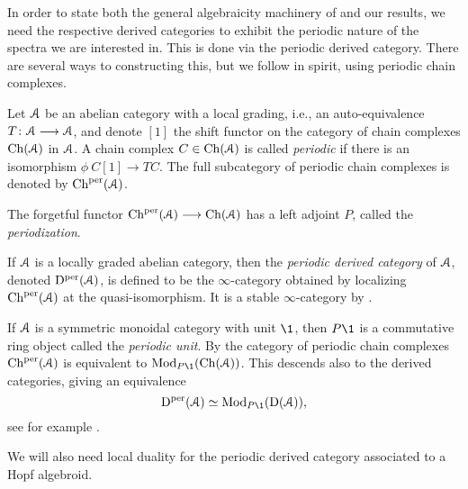 In order to state both the general algebraicity machinery of \cite{patchkoria-pstragowski_2021} and our results, we need the respective derived categories to exhibit the periodic nature of the spectra we are interested in. This is done via the periodic derived category. There are several ways to constructing this, but we follow \cite{franke_96} in spirit, using periodic chain complexes. 

\begin{definition}
    \label{ch1:def:periodic-chain-complex}
    Let $\EuScript{A}$ be an abelian category with a local grading, i.e., an auto-equivalence $T\colon \EuScript{A}\longrightarrow\EuScript{A}$, and denote $[1]$ the shift functor on the category of chain complexes $\mathrm{Ch}(\EuScript{A})$ in $\EuScript{A}$. A chain complex $C\in \mathrm{Ch}(\EuScript{A})$ is called \emph{periodic} if there is an isomorphism $\phi\: C[1]\longrightarrow TC$. The full subcategory of periodic chain complexes is denoted by $\mathrm{Ch}^{\mathrm{per}}(\EuScript{A})$. 
\end{definition}

\begin{definition}
    The forgetful functor $\mathrm{Ch}^{\mathrm{per}}(\EuScript{A})\longrightarrow \mathrm{Ch}(\EuScript{A})$ has a left adjoint $P$, called the \emph{periodization}. 
\end{definition}

\begin{definition}
    \label{ch1:def:periodic-derived-category}
    If $\EuScript{A}$ is a locally graded abelian category, then the \emph{periodic derived category} of $\EuScript{A}$, denoted $\mathrm{D}^{\mathrm{per}}(\EuScript{A})$, is defined to be the $\infty$-category obtained by localizing $\mathrm{Ch}^{\mathrm{per}}(\EuScript{A})$ at the quasi-isomorphism. It is a stable $\infty$-category by \cite[7.8]{patchkoria-pstragowski_2021}. 
\end{definition}

\begin{remark}
    \label{ch1:rm:periodic-derived-as-modules}
    If $\EuScript{A}$ is a symmetric monoidal category with unit $\1$, then $P\1$ is a commutative ring object called the \emph{periodic unit}. By \cite[2.3]{barnes-roitzheim_2011} the category of periodic chain complexes $\mathrm{Ch}^{\mathrm{per}}(\EuScript{A})$ is equivalent to $\Mod_{P\1}(\Ch(\A))$. This descends also to the derived categories, giving an equivalence 
    $$\Dper(\A)\simeq \Mod_{P\1}(\Der(\A)),$$
    see for example \cite[3.7]{pstragowski_2021}. 
\end{remark}

We will also need local duality  for the periodic derived category associated to a Hopf algebroid. 

